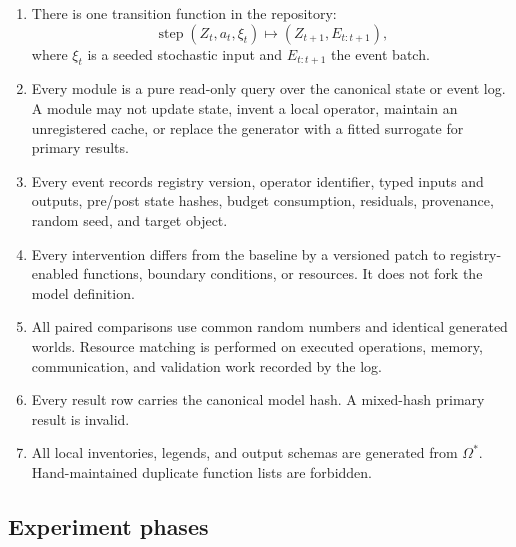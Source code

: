 \documentclass[11pt]{article}
\newcommand{\InvReg}{\Omega^{\ast}}
\begin{document}
\begin{enumerate}
\item There is one transition function in the repository:
\begin{equation}
\operatorname{step}(Z_t,a_t,\xi_t)\mapsto (Z_{t+1},E_{t:t+1}),
\end{equation}
where $\xi_t$ is a seeded stochastic input and $E_{t:t+1}$ the event batch.
\item Every module is a pure read-only query over the canonical state or event log. A module may not update state, invent a local operator, maintain an unregistered cache, or replace the generator with a fitted surrogate for primary results.
\item Every event records registry version, operator identifier, typed inputs and outputs, pre/post state hashes, budget consumption, residuals, provenance, random seed, and target object.
\item Every intervention differs from the baseline by a versioned patch to registry-enabled functions, boundary conditions, or resources. It does not fork the model definition.
\item All paired comparisons use common random numbers and identical generated worlds. Resource matching is performed on executed operations, memory, communication, and validation work recorded by the log.
\item Every result row carries the canonical model hash. A mixed-hash primary result is invalid.
\item All local inventories, legends, and output schemas are generated from $\InvReg$. Hand-maintained duplicate function lists are forbidden.
\end{enumerate}

\subsection{Experiment phases}
\end{document}
